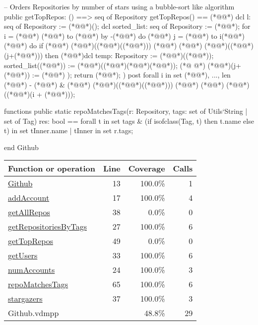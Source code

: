 \begin{vdmpp}[breaklines=true]
  -- Orders Repositories by number of stars using a bubble-sort like algorithm
  public getTopRepos: () ==> seq of Repository
  getTopRepos() == (*@\vdmnotcovered{(}@*)
   dcl l: seq of Repository := (*@@*)();
   dcl sorted_list: seq of Repository := (*@@*);
   for i = (*@@*) (*@@*) to (*@@*) by -(*@@*) do
    (*@@*) j = (*@@*) to i(*@\vdmnotcovered{-}@*)(*@@*) do
     if (*@@*) (*@@*)((*@@*)((*@@*))) (*@\vdmnotcovered{<}@*) (*@@*) (*@@*)((*@@*)(j+(*@@*)))
      then (*@\vdmnotcovered{(}@*)dcl temp: Repository := (*@@*)((*@@*));
       sorted_list((*@@*)) := (*@@*)((*@@*)(*@\vdmnotcovered{+}@*)(*@@*));
(*@
\label{repoMatchesTags:65}
@*)
       (*@@*)(j+(*@@*)) := (*@@*)
   );
   return (*@@*);
  )
  post forall i in set {(*@@*), ..., len (*@@*) - (*@@*)} & (*@@*) (*@@*)((*@@*)((*@@*))) (*@\vdmnotcovered{>=}@*) (*@@*) (*@@*)((*@@*)(i + (*@@*)));

 functions
  public static repoMatchesTags(r: Repository, tags: set of Utils`String | set of Tag) res: bool ==
  forall t in set tags & (if isofclass(Tag, t) then t.name else t) in set {tInner.name | tInner in set r.tags};
  
end Github
\end{vdmpp}
\bigskip
\begin{longtable}{|l|r|r|r|}
\hline
Function or operation & Line & Coverage & Calls \\
\hline
\hline
\hyperref[Github:13]{Github} & 13&100.0\% & 1 \\
\hline
\hyperref[addAccount:17]{addAccount} & 17&100.0\% & 4 \\
\hline
\hyperref[getAllRepos:38]{getAllRepos} & 38&0.0\% & 0 \\
\hline
\hyperref[getRepositoriesByTags:27]{getRepositoriesByTags} & 27&100.0\% & 6 \\
\hline
\hyperref[getTopRepos:49]{getTopRepos} & 49&0.0\% & 0 \\
\hline
\hyperref[getUsers:33]{getUsers} & 33&100.0\% & 6 \\
\hline
\hyperref[numAccounts:24]{numAccounts} & 24&100.0\% & 3 \\
\hline
\hyperref[repoMatchesTags:65]{repoMatchesTags} & 65&100.0\% & 6 \\
\hline
\hyperref[stargazers:37]{stargazers} & 37&100.0\% & 3 \\
\hline
\hline
Github.vdmpp & & 48.8\% & 29 \\
\hline
\end{longtable}

